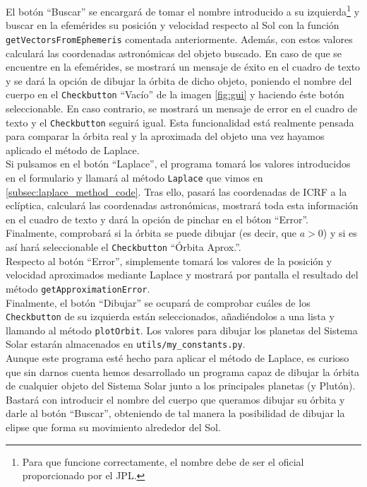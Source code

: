El botón ``Buscar'' se encargará de tomar el nombre introducido a su izquierda\footnote{Para que funcione correctamente, el nombre debe de ser el oficial proporcionado por el JPL.} y buscar en la efemérides su posición y velocidad respecto al Sol con la función \texttt{getVectorsFromEphemeris} comentada anteriormente. Además, con estos valores calculará las coordenadas astronómicas del objeto buscado. En caso de que se encuentre en la efemérides, se mostrará un mensaje de éxito en el cuadro de texto y se dará la opción de dibujar la órbita de dicho objeto, poniendo el nombre del cuerpo en el \texttt{Checkbutton} ``Vacío'' de la imagen \ref{fig:gui} y haciendo éste botón seleccionable. En caso contrario, se mostrará un mensaje de error en el cuadro de texto y el \texttt{Checkbutton} seguirá igual. Esta funcionalidad está realmente pensada para comparar la órbita real y la aproximada del objeto una vez hayamos aplicado el método de Laplace.\\

Si pulsamos en el botón ``Laplace'', el programa tomará los valores introducidos en el formulario y llamará al método \texttt{Laplace} que vimos en \ref{subsec:laplace_method_code}. Tras ello, pasará las coordenadas de ICRF a la eclíptica, calculará las coordenadas astronómicas, mostrará toda esta información en el cuadro de texto y dará la opción de pinchar en el bóton ``Error''. Finalmente, comprobará si la órbita se puede dibujar (es decir, que $a>0$) y si es así hará seleccionable el \texttt{Checkbutton} ``Órbita Aprox.''.\\

Respecto al botón ``Error'', simplemente tomará los valores de la posición y velocidad aproximados mediante Laplace y mostrará por pantalla el resultado del método \texttt{getApproximationError}.\\

Finalmente, el botón ``Dibujar'' se ocupará de comprobar cuáles de los \texttt{Checkbutton} de su izquierda están seleccionados, añadiéndolos a una lista y llamando al método \texttt{plotOrbit}. Los valores para dibujar los planetas del Sistema Solar estarán almacenados en \texttt{utils/my\_constants.py}.\\

Aunque este programa esté hecho para aplicar el método de Laplace, es curioso que sin darnos cuenta hemos desarrollado un programa capaz de dibujar la órbita de cualquier objeto del Sistema Solar junto a los principales planetas (y Plutón). Bastará con introducir el nombre del cuerpo que queramos dibujar su órbita y darle al botón ``Buscar'', obteniendo de tal manera la posibilidad de dibujar la elipse que forma su movimiento alrededor del Sol.\\

\newpage
\thispagestyle{empty}

